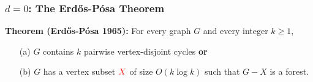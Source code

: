 \documentclass{beamer}
\begin{document}
\begin{frame}
  \frametitle{$d=0$: The Erdős-Pósa Theorem}

    \noindent\textbf{Theorem (Erdős-Pósa 1965):}
    For every graph $G$ and every integer $k\ge 1$,
    \begin{enumerate}%
      \item[(a)] $G$ contains $k$ pairwise vertex-disjoint cycles \textbf{or}
      \item[(b)] $G$ has a vertex subset $\mathcolor{red}{X}$ of size $O(k\log k)$ such that $G-X$ is a forest. 
    \end{enumerate}
    \begin{center}

\end{center}
\end{frame}
\end{document}
